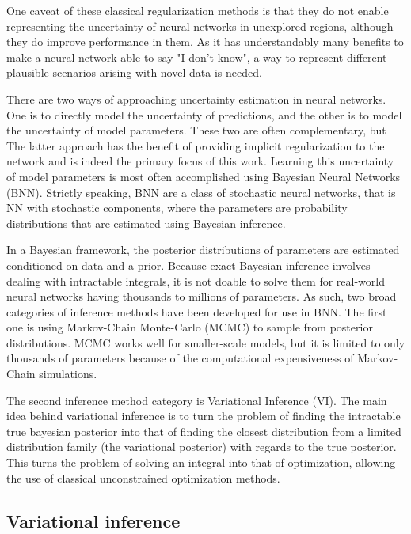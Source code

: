 	One caveat of these classical regularization methods is that they do not enable representing the uncertainty of neural networks in unexplored regions, although they do improve performance in them. As it has understandably many benefits to make a neural network able to say "I don't know", a way to represent different plausible scenarios arising with novel data is needed. 
	
	There are two ways of approaching uncertainty estimation in neural networks. One is to directly model the uncertainty of predictions, and the other is to model the uncertainty of model parameters. These two are often complementary, but The latter approach has the benefit of providing implicit regularization to the network and is indeed the primary focus of this work. Learning this uncertainty of model parameters is most often accomplished using Bayesian Neural Networks (BNN). Strictly speaking, BNN are a class of stochastic neural networks, that is NN with stochastic components, where the parameters are probability distributions that are estimated using Bayesian inference.
	
	In a Bayesian framework, the posterior distributions of parameters are estimated conditioned on data and a prior. Because exact Bayesian inference involves dealing with intractable integrals, it is not doable to solve them for real-world neural networks having thousands to millions of parameters. As such, two broad categories of inference methods have been developed for use in BNN. The first one is using Markov-Chain Monte-Carlo (MCMC) to sample from posterior distributions. MCMC works well for smaller-scale models, but it is limited to only thousands of parameters because of the computational expensiveness of Markov-Chain simulations. 
	
	The second inference method category is Variational Inference (VI). The main idea behind variational inference is to turn the problem of finding the intractable true bayesian posterior into that of finding the closest distribution from a limited distribution family (the variational posterior) with regards to the true posterior. This turns the problem of solving an integral into that of optimization, allowing the use of classical unconstrained optimization methods. 
	
	

\subsection{Variational inference}
\label{section:vi}


